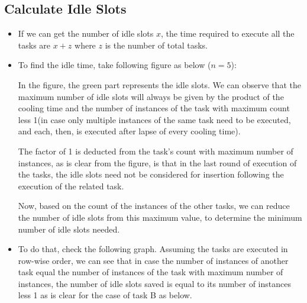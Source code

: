 \subsection{Calculate Idle Slots}
\begin{itemize}
\item If we can get the number of idle slots $x$, the time required to execute all the tasks are $x+z$ where $z$ is the number of total tasks.
\item To find the idle time, take following figure as below ($n=5$):
\begin{figure}[H]
\centering
{}
\end{figure}
In the figure, the green part represents the idle slots. We can observe that the maximum number of idle slots will always be given by the product of the cooling time and the number of instances of the task with maximum count less 1(in case only multiple instances of the same task need to be executed, and each, then, is executed after lapse of every cooling time). 

The factor of 1 is deducted from the task's count with maximum number of instances, as is clear from the figure, is that in the last round of execution of the tasks, the idle slots need not be considered for insertion following the execution of the related task. 

Now, based on the count of the instances of the other tasks, we can reduce the number of idle slots from this maximum value, to determine the minimum number of idle slots needed.
\item To do that, check the following graph. Assuming the tasks are executed in row-wise order, we can see that in case the number of instances of another task equal the number of instances of the task with maximum number of instances, the number of idle slots saved is equal to its number of instances less 1 as is clear for the case of task B as below. 

\begin{figure}[H]
\centering
{}
\end{figure}
\end{itemize}

